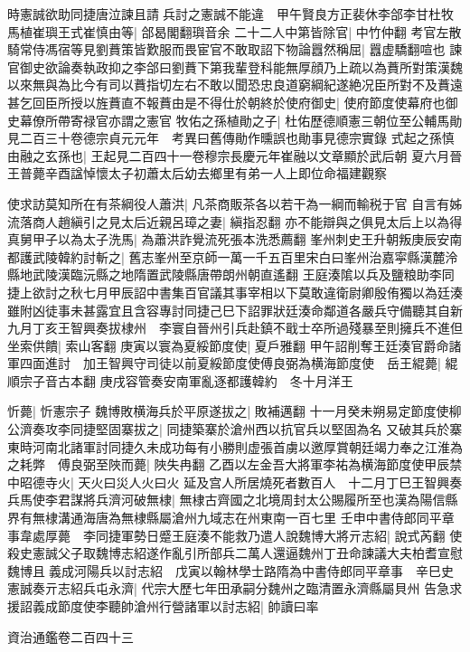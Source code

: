 時憲誠欲助同捷唐泣諫且請兵討之憲誠不能違　甲午賢良方正裴休李郃李甘杜牧馬植崔璵王式崔慎由等|{
	郃曷閣翻璵音余}
二十二人中第皆除官|{
	中竹仲翻}
考官左散騎常侍馮宿等見劉蕡策皆歎服而畏宦官不敢取詔下物論囂然稱屈|{
	囂虚驕翻喧也}
諫官御史欲論奏執政抑之李郃曰劉蕡下第我輩登科能無厚顔乃上疏以為蕡所對策漢魏以來無與為比今有司以蕡指切左右不敢以聞恐忠良道窮綱紀遂絶况臣所對不及蕡遠甚乞回臣所授以旌蕡直不報蕡由是不得仕於朝終於使府御史|{
	使府節度使幕府也御史幕僚所帶寄禄官亦謂之憲官}
牧佑之孫植勛之子|{
	杜佑歷德順憲三朝位至公輔馬勛見二百三十卷德宗貞元元年　考異曰舊傳勛作曛誤也勛事見德宗實錄}
式起之孫慎由融之玄孫也|{
	王起見二百四十一卷穆宗長慶元年崔融以文章顯於武后朝}
夏六月晉王普薨辛酉諡悼懷太子初蕭太后幼去鄉里有弟一人上即位命福建觀察

使求訪莫知所在有茶綱役人蕭洪|{
	凡茶商販茶各以若干為一綱而輸税于官}
自言有姊流落商人趙縝引之見太后近親呂璋之妻|{
	縝指忍翻}
亦不能辯與之俱見太后上以為得真舅甲子以為太子洗馬|{
	為蕭洪詐覺流死張本洗悉薦翻}
峯州刺史王升朝叛庚辰安南都護武陵韓約討斬之|{
	舊志峯州至京師一萬一千五百里宋白曰峯州治嘉寜縣漢麓泠縣地武陵漢臨沅縣之地隋置武陵縣唐帶朗州朝直遙翻}
王庭湊隂以兵及鹽粮助李同捷上欲討之秋七月甲辰詔中書集百官議其事宰相以下莫敢違衛尉卿殷侑獨以為廷湊雖附凶徒事未甚露宜且含容專討同捷己巳下詔罪狀廷湊命鄰道各嚴兵守備聽其自新九月丁亥王智興奏拔棣州　李寰自晉州引兵赴鎮不戢士卒所過殘暴至則擁兵不進但坐索供饋|{
	索山客翻}
庚寅以寰為夏綏節度使|{
	夏戶雅翻}
甲午詔削奪王廷湊官爵命諸軍四面進討　加王智興守司徒以前夏綏節度使傅良弼為横海節度使　岳王緄薨|{
	緄順宗子音古本翻}
庚戌容管奏安南軍亂逐都護韓約　冬十月洋王

忻薨|{
	忻憲宗子}
魏博敗横海兵於平原遂拔之|{
	敗補邁翻}
十一月癸未朔易定節度使柳公濟奏攻李同捷堅固寨拔之|{
	同捷築寨於滄州西以抗官兵以堅固為名}
又破其兵於寨東時河南北諸軍討同捷久未成功每有小勝則虚張首虜以邀厚賞朝廷竭力奉之江淮為之耗弊　傅良弼至陜而薨|{
	陜失冉翻}
乙酉以左金吾大將軍李祐為横海節度使甲辰禁中昭德寺火|{
	天火曰災人火曰火}
延及宫人所居燒死者數百人　十二月丁巳王智興奏兵馬使李君謀將兵濟河破無棣|{
	無棣古齊國之北境周封太公賜履所至也漢為陽信縣界有無棣溝通海唐為無棣縣屬滄州九域志在州東南一百七里}
壬申中書侍郎同平章事韋處厚薨　李同捷軍勢日蹙王庭湊不能救乃遣人說魏博大將亓志紹|{
	說式芮翻}
使殺史憲誠父子取魏博志紹遂作亂引所部兵二萬人還逼魏州丁丑命諫議大夫柏耆宣慰魏博且義成河陽兵以討志紹　戊寅以翰林學士路隋為中書侍郎同平章事　辛巳史憲誠奏亓志紹兵屯永濟|{
	代宗大歷七年田承嗣分魏州之臨清置永濟縣屬貝州}
告急求援詔義成節度使李聽帥滄州行營諸軍以討志紹|{
	帥讀曰率}


資治通鑑卷二百四十三
